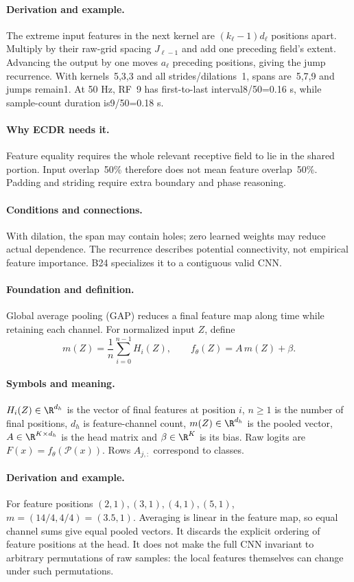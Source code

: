 \paragraph{Derivation and example.}
The extreme input features in the next kernel are
$(k_\ell-1)d_\ell$ positions apart. Multiply by their raw-grid spacing
$J_{\ell-1}$ and add one preceding field's extent. Advancing the output
by one moves $a_\ell$ preceding positions, giving the jump recurrence.
With kernels~5,3,3 and all strides/dilations~1, spans are~5,7,9 and jumps
remain1. At 50 Hz, RF~9 has first-to-last interval8/50=0.16 s, while
sample-count duration is9/50=0.18 s.
\paragraph{Why ECDR needs it.}
Feature equality requires the whole relevant receptive field to lie in
the shared portion. Input overlap~50\% therefore does not mean feature
overlap~50\%. Padding and striding require extra boundary and phase reasoning.
\paragraph{Conditions and connections.}
With dilation, the span may contain holes; zero learned weights may reduce
actual dependence. The recurrence describes potential connectivity, not
empirical feature importance. B24 specializes it to a contiguous valid CNN.

\paragraph{Foundation and definition.}
Global average pooling (GAP) reduces a final feature map along time while
retaining each channel. For normalized input $Z$, define
\[
 m(Z)=\frac1n\sum_{i=0}^{n-1}H_i(Z),\qquad
 f_\theta(Z)=A\,m(Z)+\beta.
\]
\paragraph{Symbols and meaning.}
$H_i(Z)\in\R^{d_h}$ is the vector of final features at position $i$,
$n\ge1$ is the number of final positions, $d_h$ is feature-channel count,
$m(Z)\in\R^{d_h}$ is the pooled vector, $A\in\R^{K\times d_h}$ is
the head matrix and $\beta\in\R^K$ is its bias. Raw logits are
$F(x)=f_\theta(\mathcal P(x))$. Rows $A_{j,:}$ correspond to classes.
\paragraph{Derivation and example.}
For feature positions $(2,1),(3,1),(4,1),(5,1)$,
$m=(14/4,4/4)=(3.5,1)$. Averaging is linear in the feature map, so
equal channel sums give equal pooled vectors. It discards the explicit
ordering of feature positions at the head. It does not make the full CNN
invariant to arbitrary permutations of raw samples: the local features
themselves can change under such permutations.
